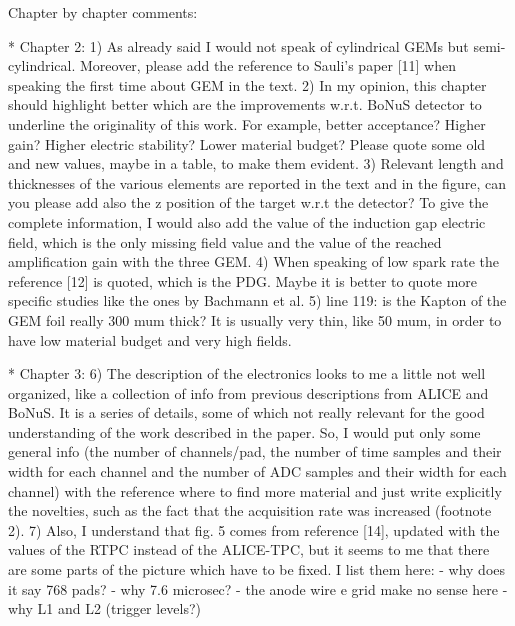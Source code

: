 \documentclass[a4paper,11pt,twoside]{article}
\begin{document}
Chapter by chapter comments:

* Chapter 2:
1)	As already said I would not speak of cylindrical GEMs but semi-cylindrical. Moreover, please add the reference to Sauli's paper [11] when speaking the first time about GEM in the text.
2)	In my opinion, this chapter should highlight better which are the improvements w.r.t. BoNuS detector to underline the originality of this work. For example, better acceptance? Higher gain? Higher electric stability? Lower material budget? Please quote some old and new values, maybe in a table, to make them evident.
3)	Relevant length and thicknesses of the various elements are reported in the text and in the figure, can you please add also the z position of the target w.r.t the detector? To give the complete information, I would also add the value of the induction gap electric field, which is the only missing field value and the value of the reached amplification gain with the three GEM.
4)	When speaking of low spark rate the reference [12] is quoted, which is the PDG. Maybe it is better to quote more specific studies like the ones by Bachmann et al.
5)	line 119: is the Kapton of the GEM foil really 300 mum thick? It is usually very thin, like 50 mum, in order to have low material budget and very high fields.

* Chapter 3:
6)	The description of the electronics looks to me a little not well organized, like a collection of info from previous descriptions from ALICE and BoNuS. It is a series of details, some of which not really relevant for the good understanding of the work described in the paper. So, I would put only some general info (the number of channels/pad, the number of time samples and their width for each channel and the number of  ADC samples and their width for each channel) with the reference where to find more material and just write explicitly the novelties, such as the fact that the acquisition rate was increased (footnote 2).
7)	Also, I understand that fig. 5 comes from reference [14], updated with the values of the RTPC instead of the ALICE-TPC, but it seems to me that there are some parts of the picture which have to be fixed. I list them here:
- why does it say 768 pads?
- why 7.6 microsec?
- the anode wire e grid make no sense here
- why L1 and L2 (trigger levels?) 
\end{document}
